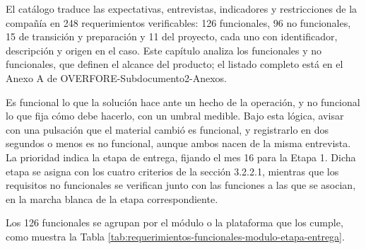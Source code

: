 \documentclass[subdoc]{../../comun/overfore}
\begin{document}
El catálogo traduce las expectativas, entrevistas, indicadores y restricciones de la compañía en 248 requerimientos verificables: 126 funcionales, 96 no funcionales, 15 de transición y preparación y 11 del proyecto, cada uno con identificador, descripción y origen en el caso. Este capítulo analiza los funcionales y no funcionales, que definen el alcance del producto; el listado completo está en el Anexo A de OVERFORE-Subdocumento2-Anexos.

Es funcional lo que la solución hace ante un hecho de la operación, y no funcional lo que fija cómo debe hacerlo, con un umbral medible. Bajo esta lógica, avisar con una pulsación que el material cambió es funcional, y registrarlo en dos segundos o menos es no funcional, aunque ambos nacen de la misma entrevista. La prioridad indica la etapa de entrega, fijando el mes 16 para la Etapa 1. Dicha etapa se asigna con los cuatro criterios de la sección 3.2.2.1, mientras que los requisitos no funcionales se verifican junto con las funciones a las que se asocian, en la marcha blanca de la etapa correspondiente.

Los 126 funcionales se agrupan por el módulo o la plataforma que los cumple, como muestra la Tabla \ref{tab:requerimientos-funcionales-modulo-etapa-entrega}.
\end{document}
